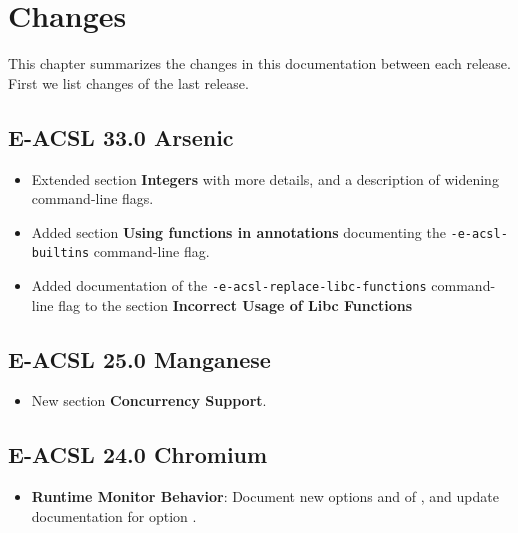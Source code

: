\chapter{Changes}\label{chap:changes}

This chapter summarizes the changes in this documentation between each \eacsl
release. First we list changes of the last release.


\section*{E-ACSL 33.0 Arsenic}

\begin{itemize}
\item Extended section \textbf{Integers} with more details, and
  a description of widening command-line flags.
\item Added section \textbf{Using \C functions in annotations} documenting the
  \texttt{-e-acsl-builtins} command-line flag.
\item Added documentation of the \texttt{-e-acsl-replace-libc-functions}
  command-line flag to the section \textbf{Incorrect Usage of Libc Functions}

\end{itemize}

\section*{E-ACSL 25.0 Manganese}

\begin{itemize}
\item New section \textbf{Concurrency Support}.
\end{itemize}

\section*{E-ACSL 24.0 Chromium}

\begin{itemize}
\item \textbf{Runtime Monitor Behavior}: Document new options
   and  of
  \eacslgcc, and update documentation for option .
\end{itemize}

